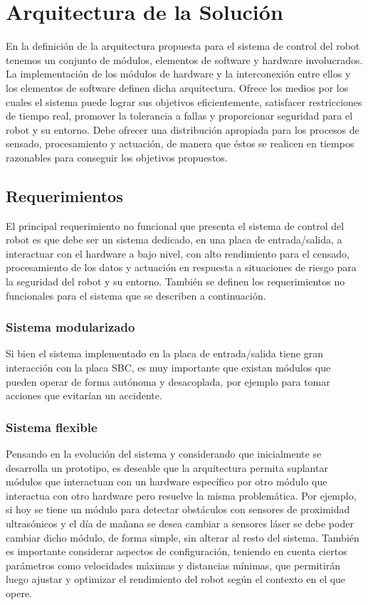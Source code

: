 \documentclass[withindex,glossary]{cam-thesis}
\begin{document}
\section{Arquitectura de la Solución}

En la definición de la arquitectura propuesta para el sistema de control del robot tenemos un conjunto de módulos, elementos de software y hardware involucrados. La implementación de los módulos de hardware y la interconexión entre ellos y los elementos de software definen dicha arquitectura.
Ofrece los medios por los cuales el sistema puede lograr sus objetivos eficientemente, satisfacer restricciones de tiempo real, promover la tolerancia a fallas y proporcionar seguridad para el robot y su entorno. Debe ofrecer una distribución apropiada para los procesos de sensado, procesamiento y actuación, de manera que éstos se realicen en tiempos razonables para conseguir los objetivos propuestos.

\subsection{Requerimientos}
El principal requerimiento no funcional que presenta el sistema de control del robot es que debe ser un sistema dedicado, en una placa de entrada/salida, a interactuar con el hardware a bajo nivel, con alto rendimiento para el censado, procesamiento de los datos y actuación en respuesta a situaciones de riesgo para la seguridad del robot y su entorno. También se definen los requerimientos no funcionales para el sistema que se describen a continuación.
\subsubsection{Sistema modularizado}
Si bien el sistema implementado en la placa de entrada/salida tiene gran interacción con la placa SBC, es muy importante que existan módulos que pueden operar de forma autónoma y desacoplada, por ejemplo para tomar acciones que evitarían un accidente.
\subsubsection{Sistema flexible}
Pensando en la evolución del sistema y considerando que inicialmente se desarrolla un prototipo, es deseable que la arquitectura permita suplantar módulos que interactuan con un hardware específico por otro módulo que interactua con otro hardware pero resuelve la misma problemática. Por ejemplo, si hoy se tiene un módulo para detectar obstáculos con sensores de proximidad ultrasónicos y el día de mañana se desea cambiar a sensores láser se debe poder cambiar dicho módulo, de forma simple, sin alterar al resto del sistema.
También es importante considerar aspectos de configuración, teniendo en cuenta ciertos parámetros como velocidades máximas y distancias mínimas, que permitirán luego ajustar y optimizar el rendimiento del robot según el contexto en el que opere.
\end{document}
